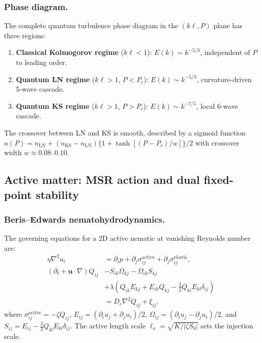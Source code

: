 \subsubsection*{Phase diagram.}
The complete quantum turbulence phase diagram in the $(k\ell, P)$ plane has three regions:
\begin{enumerate}
\item \textbf{Classical Kolmogorov regime} ($k\ell<1$): $E(k)\sim k^{-5/3}$, independent of $P$ to leading order.
\item \textbf{Quantum LN regime} ($k\ell>1$, $P<P_c$): $E(k)\sim k^{-5/3}$, curvature-driven 5-wave cascade.
\item \textbf{Quantum KS regime} ($k\ell>1$, $P>P_c$): $E(k)\sim k^{-7/5}$, local 6-wave cascade.
\end{enumerate}
The crossover between LN and KS is smooth, described by a sigmoid function $n(P)=n_{\mathrm{LN}}+(n_{\mathrm{KS}}-n_{\mathrm{LN}})\{1+\tanh[(P-P_c)/w]\}/2$ with crossover width $w\approx 0.08$--$0.10$.

\subsection{Active matter: MSR action and dual fixed-point stability\label{app:pred_am}}

\subsubsection*{Beris--Edwards nematohydrodynamics.}
The governing equations for a 2D active nematic at vanishing Reynolds number are:
\begin{align}
\eta\nabla^2 u_i &= \partial_i p + \partial_j\sigma^{\mathrm{active}}_{ij} + \partial_j\sigma^{\mathrm{elastic}}_{ij}, \\
(\partial_t + \mathbf{u}\cdot\nabla)Q_{ij} &- S_{ik}\Omega_{kj} - \Omega_{ik}S_{kj} \nonumber \\
&+ \lambda\!\left(Q_{ik}E_{kj}+E_{ik}Q_{kj}-\tfrac{2}{3}Q_{kl}E_{kl}\delta_{ij}\right) \nonumber \\
&= D_r\nabla^2 Q_{ij} + \xi_{ij},
\end{align}
where $\sigma^{\mathrm{active}}_{ij}=-\zeta Q_{ij}$, $E_{ij}=(\partial_i u_j+\partial_j u_i)/2$, $\Omega_{ij}=(\partial_i u_j-\partial_j u_i)/2$, and $S_{ij}=E_{ij}-\frac{2}{3}Q_{kl}E_{kl}\delta_{ij}$. The active length scale $\ell_a=\sqrt{K/|\zeta S_0|}$ sets the injection scale.

